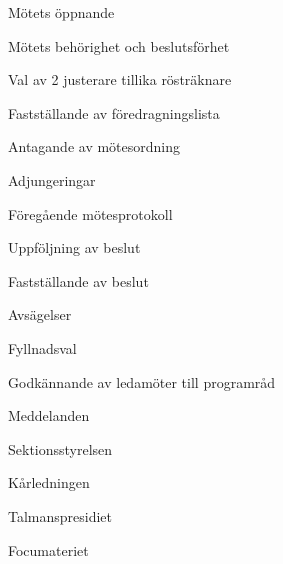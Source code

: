 \documentclass[prelim]{sektionsmote}
\begin{document}
\maketitle

\begin{ootd}

\item{Mötets öppnande}

\item{Mötets behörighet och beslutsförhet}

\item{Val av 2 justerare tillika rösträknare}

\item{Fastställande av föredragningslista}

\item{Antagande av mötesordning}

\item{Adjungeringar}

\item{Föregående mötesprotokoll}

\item{Uppföljning av beslut}

\item{Fastställande av beslut}
\begin{ootd}
    \item Avsägelser
    \item Fyllnadsval
    \item Godkännande av ledamöter till programråd
\end{ootd}

\item{Meddelanden}
\begin{ootd}
    \item Sektionsstyrelsen
    \item Kårledningen
    \item Talmanspresidiet
    \item Focumateriet
\end{ootd}


\end{ootd}
\end{document}
